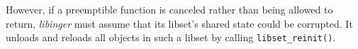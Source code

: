 However, if a preemptible function
is canceled rather than being allowed to return, \textit{libinger} must
assume that its libset's shared state could be corrupted.  It unloads and reloads
all objects in such a libset by calling \texttt{libset\_reinit()}.

